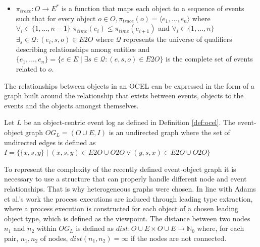 \begin{definition}
\begin{itemize}
        \item $\pi_{trace}: O \to E^*$ is a function that maps each object to a sequence of events such that for every object $o \in O, \pi_{trace}(o)=\langle e_1,...,e_n \rangle$ where $\forall_i \in \{1,...,n-1\}$ $\pi_{time}(e_i)\leq \pi_{time}(e_{i+1})$ and $\forall_i \in \{1,...,n\}$ $\exists_s \in \mathcal{Q}: (e_i, s, o) \in E2O$ where $\mathcal{Q}$ represents the universe of qualifiers describing relationships among entities and $\{e_1,...,e_n\} = \{e\in E \mid \exists s\in\mathcal{Q}: (e,s,o)\in E2O\}$ is the complete set of events related to $o$.
        \end{itemize}
        \end{definition}
        The relationships between objects in an OCEL can be expressed in the form of a graph built around the relationship that exists between events, objects to the events and the objects amongst themselves.

        \begin{definition}
        \label{def:ev_ob_graph}
            Let $L$ be an object-centric event log as defined in Definition \ref{def:ocel}.
            The event-object graph $OG_L=(O \cup E,I)$ is an undirected graph where the set of undirected edges is defined as $I = \{\{x,s,y\} \mid (x,s,y)\in E2O\cup O2O \lor (y,s,x)\in E2O\cup O2O\}$
        \end{definition}
        
        To represent the complexity of the recently defined event-object graph it is necessary to use a structure that can properly handle different node and event relationships. That is why heterogeneous graphs were chosen. In line with Adams et al.'s work the process executions are induced through leading type extraction, where a process execution is constructed for each object of a chosen leading object type, which is defined as the viewpoint.
        The distance between two nodes $n_1$ and $n_2$ within $OG_L$ is defined as $dist:O \cup E \times O \cup E \to \mathbb{N}_0$ where, for each pair, $n_1, n_2$ of nodes, $dist(n_1,n_2)= \infty$ if the nodes are not connected.

